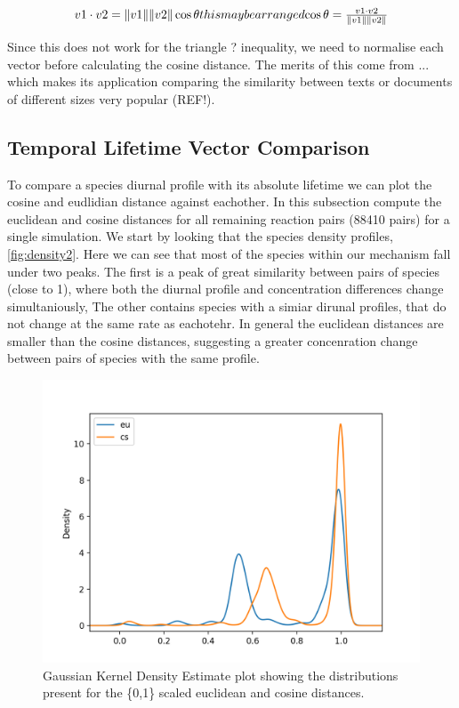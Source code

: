 \begin{equation}
v1 \cdot v2 = \|v1\|\|v2\| \cos \theta
$$this may be arranged$$
\cos \theta = \frac{ v1 \cdot v2}{\|v1\|\|v2\|}
\end{equation}

Since this does not work for the triangle ? inequality, we need to normalise each vector before calculating the cosine distance. The merits of this come from  ... which makes its application comparing the similarity between texts or documents of different sizes very popular (REF!). \\



\subsection{Temporal Lifetime Vector Comparison}

To compare a species diurnal profile with its absolute lifetime we can plot the cosine and eudlidian distance against eachother. In this subsection compute the euclidean and cosine distances for all remaining reaction pairs (88410 pairs) for a single simulation. We start by looking that the species density profiles, \autoref{fig:density2}. Here we can see that most of the species within our mechanism fall under two peaks. The first is a peak of great similarity between pairs of species (close to 1), where both the diurnal profile and concentration differences change simultaniously, The other contains species with a simiar dirunal profiles, that do not change at the same rate as eachotehr. In general the euclidean distances are smaller than the cosine distances, suggesting a greater concenration change between pairs of species with the same profile. 



\begin{figure}
\includegraphics[width=.7\textwidth]{fig/metric_density.png}
\caption{Gaussian Kernel Density Estimate plot showing the distributions present for the \{0,1\} scaled euclidean and cosine distances.}
\label{fig:density2}
\end{figure}



